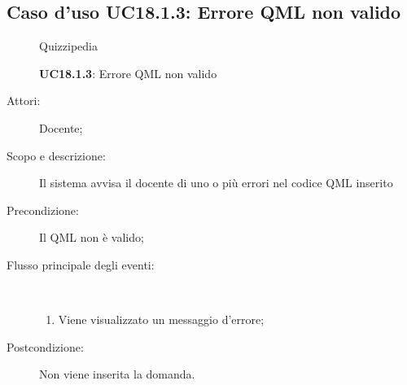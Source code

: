 \subsection{Caso d'uso UC18.1.3: Errore QML non valido}
	\begin{figure}[H]
		\centering
		\begin{resizedtikzpicture}{\textwidth}
		\begin{umlsystem}[x=0, fill=lightgray!20]{Quizzipedia}
		\end{umlsystem}
		\end{resizedtikzpicture}
		\caption{\textbf{UC18.1.3}: Errore QML non valido}
		\label{UC18.1.3}
	\end{figure}
\begin{description}
\item[Attori:] Docente;
\item[Scopo e descrizione:] Il sistema avvisa il docente di uno o più errori nel codice QML inserito
      \item[Precondizione:] Il QML non è valido;

        \item[Flusso principale degli eventi:] \ 
 \begin{enumerate}
          \item Viene visualizzato un messaggio d'errore;

      \end{enumerate}
    \item[Postcondizione:] Non viene inserita la domanda.
  \end{description}
\hypertarget{UC18.1.4}{}
